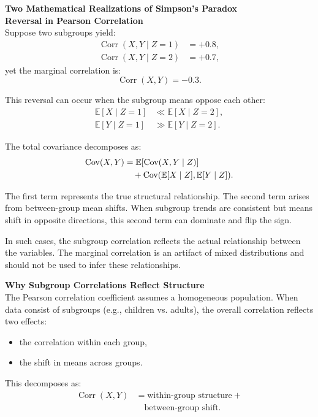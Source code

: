 \begin{technical}
{\Large\textbf{Two Mathematical Realizations of Simpson's Paradox}}\\[0.3em]
\vspace{1em}
\noindent\textbf{Reversal in Pearson Correlation}\\[0.5em]
Suppose two subgroups yield:
\begin{align*}
\operatorname{Corr}(X, Y \mid Z=1) &= +0.8, \\
\operatorname{Corr}(X, Y \mid Z=2) &= +0.7,
\end{align*}
yet the marginal correlation is:
\[
\operatorname{Corr}(X, Y) = -0.3.
\]

This reversal can occur when the subgroup means oppose each other:
\begin{align*}
\mathbb{E}[X \mid Z=1] &\ll \mathbb{E}[X \mid Z=2], \\
\mathbb{E}[Y \mid Z=1] &\gg \mathbb{E}[Y \mid Z=2].
\end{align*}

The total covariance decomposes as:
\begin{align*}
\operatorname{Cov}(X, Y) &= \mathbb{E}[\operatorname{Cov}(X, Y \mid Z)] \notag \\
&\quad + \operatorname{Cov}(\mathbb{E}[X \mid Z], \mathbb{E}[Y \mid Z]).
\end{align*}

The first term represents the true structural relationship. The second term arises from between-group mean shifts. When subgroup trends are consistent but means shift in opposite directions, this second term can dominate and flip the sign.

In such cases, the subgroup correlation reflects the actual relationship between the variables. The marginal correlation is an artifact of mixed distributions and should not be used to infer these relationships.

\noindent\textbf{Why Subgroup Correlations Reflect Structure}\\[0.5em]
The Pearson correlation coefficient assumes a homogeneous population. When data consist of subgroups (e.g., children vs. adults), the overall correlation reflects two effects:
\begin{itemize}
\item the correlation within each group,
\item the shift in means across groups.
\end{itemize}

This decomposes as:
\begin{align*}
\operatorname{Corr}(X, Y) &= 
\text{within-group structure} +\\& \quad\text{between-group shift}.
\end{align*}


\end{technical}
